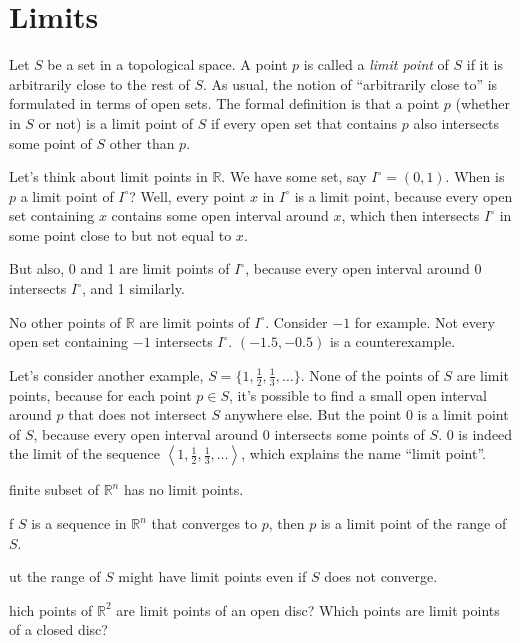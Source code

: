 \documentclass{article}
\def\R{{\mathbb R}}
\def\Rn{{\R^n}}
\newcounter{exercisecounter}\setcounter{exercisecounter}{1}
\def\Exercise.#1\par{{\item\small {\bf Exercise \number\theexercisecounter}.#1\addtocounter{exercisecounter}{1}}}
\begin{document}
\section*{Limits}

Let $S$ be a set in a topological space.  A point $p$ is called a {\em
  limit point\/} of $S$ if it is arbitrarily close to the rest of $S$.
As usual, the notion of ``arbitrarily close to'' is formulated in
terms of open sets.  The formal definition is that a point $p$
(whether in $S$ or not) is a limit point of $S$ if every open set that
contains $p$ also intersects some point of $S$ other than $p$.

Let's think about limit points in $\R$.  We have some set, say
$I^\circ = (0,1)$.  When is $p$ a limit point of $I^\circ$?  Well, every point
$x$ in $I^\circ$ is a limit point, because every open set containing
$x$ contains some open interval around $x$, which then intersects
$I^\circ$ in some point close to but not equal to $x$.

But also, 0 and 1 are limit points of $I^\circ$, because every open
interval around 0 intersects $I^\circ$, and 1 similarly.

No other points of $\R$ are limit points of $I^\circ$.  Consider $-1$
for example.  Not every open set containing $-1$ intersects $I^\circ$.
$(-1.5, -0.5)$ is a counterexample.


Let's consider another example, $S = \{1, \frac12, \frac13, \ldots\}$. 
None of the points of $S$ are limit points, because for each
point $p\in S$, it's possible to find a small open interval around $p$
that does not intersect $S$ anywhere else.  But the point 0 is a limit
point of $S$, because every open interval around 0 intersects some
points of $S$.  0 is indeed the limit of the sequence $\left< 1, \frac12,
\frac13, \ldots\right>$, which explains the name ``limit point''.

\begin{itemize}
\Exercise. A finite subset of $\R^n$ has no limit points.

\Exercise. If $S$ is a sequence in $\Rn$ that converges to $p$, then $p$
is a limit point of the range of $S$.

\Exercise. But the range of $S$ might have limit points even if $S$ does not converge.

\Exercise. Which points of $\R^2$ are limit points of an open disc?
Which points are limit points of a closed disc?

\end{itemize}
\end{document}
